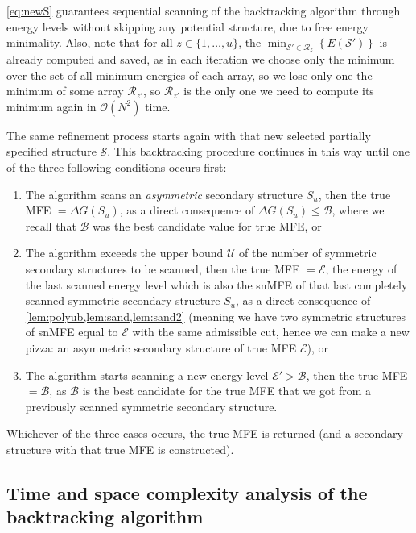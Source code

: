 \documentclass[11pt,letterpaper]{article}  \usepackage[margin=1in]{geometry}
\theoremstyle{definition}  \newtheorem{Definition}[theorem]{Definition}
\newcommand{\snMFE}{snMFE\xspace}
\begin{document}
\begin{remark}\label{remark:newS}
	\cref{eq:newS} guarantees sequential scanning of the backtracking algorithm through energy levels without skipping any potential structure, due to free energy minimality. Also, note that for all $z \in \{1,\ldots,u\}$, the  $\min_{\mathcal{S}' \in \mathcal{R}_z}\left\{ E(\mathcal{S}')\right\}$ is already computed and saved, as in each iteration we choose only the minimum over the set of all minimum energies of each array, so we lose only one the minimum of some array $\mathcal{R}_{z'}$, so $\mathcal{R}_{z'}$ is the only one we need to compute its minimum again in $\mathcal{O}(N^2)$ time.        
\end{remark} 

The same refinement process starts again with that new selected partially specified structure $\mathcal{S}$. This backtracking procedure continues in this way until one of the three following conditions occurs first: 
\begin{enumerate}
	\item  The algorithm scans an {\em asymmetric} secondary structure $S_u$, then the true MFE $= \Delta G (S_u)$, as a direct consequence of $\Delta G (S_u) \leq \mathcal{B}$, where we recall that $\mathcal{B}$ was the best candidate value for true MFE, or 
	\item  The algorithm exceeds the upper bound $\mathcal{U}$ of the number of symmetric secondary structures to be scanned, then the true MFE $= \mathcal{E}$, the energy of the last scanned energy level which is also the \snMFE of that last completely scanned symmetric secondary structure $S_u$, as a direct consequence of \cref{lem:polyub,lem:sand,lem:sand2} (meaning we have two symmetric structures of  \snMFE equal to $\mathcal{E}$ with the same admissible cut, hence we can make a new pizza: an asymmetric secondary structure of true MFE $\mathcal{E}$), or
	\item  The algorithm starts scanning a new energy level $\mathcal{E}' > \mathcal{B}$, then the true MFE $= \mathcal{B}$, as $\mathcal{B}$ is the best candidate for the true MFE that we got from a previously scanned symmetric secondary structure.   
\end{enumerate}
Whichever of the three cases occurs, the true MFE is returned (and a secondary structure with that true MFE is constructed).

\subsection{Time and space complexity analysis of the backtracking algorithm}\label{sec:backtime}
\end{document}
